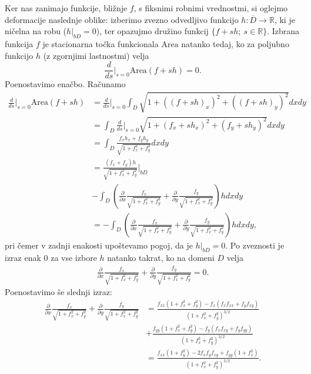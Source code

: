 \documentclass[12pt,a4paper,twoside]{article}
\theoremstyle{definition} %
\theoremstyle{plain} %
\numberwithin{equation}{section}  %
\newcommand{\R}{\mathbb R}
\begin{document}
Ker nas zanimajo funkcije, bližnje $f$, s fiksnimi robnimi vrednostmi, si oglejmo deformacije naslednje oblike:
izberimo zvezno odvedljivo funkcijo $h \colon \overline{D} \to \R$, ki je ničelna na robu ($h|_{bD} = 0$), ter opazujmo družino funkcij $\{f + sh; \ s \in \R \}$.
Izbrana funkcija $f$ je stacionarna točka funkcionala $\text{Area}$ natanko tedaj, ko za poljubno funkcijo $h$ (z zgornjimi lastnostmi) velja
\begin{equation} \label{eq:stac-area(f+sh)}
\frac{d}{ds} \Big|_{s=0} \text{Area}(f+sh) = 0.
\end{equation}
Poenostavimo enačbo. Računamo
\begin{align*}
\frac{d}{ds} \Big|_{s=0} \text{Area}(f+sh) &= \frac{d}{ds} \Big|_{s=0} \int_{D} \sqrt{1 + ((f+sh)_{x})^2 + ((f+sh)_{y})^2} dxdy \\
	&= \int_{D} \frac{d}{ds} \Big|_{s=0} \sqrt{1 + (f_{x}+sh_{x})^2 + (f_{y}+sh_{y})^2} dxdy \\
	&= \int_{D} \frac{f_{x}h_{x} + f_{y}h_{y}}{\sqrt{1 + f_{x}^2 + f_{y}^2}} dxdy \\
	&= \frac{(f_{x} + f_{y})h}{\sqrt{1 + f_{x}^2 + f_{y}^2}} \Big|_{bD} \\
	&- \int_{D} \left( \frac{\partial}{\partial x} \frac{f_{x}}{\sqrt{1 + f_{x}^2 + f_{y}^2}} + \frac{\partial}{\partial y} \frac{f_{y}}{\sqrt{1 + f_{x}^2 + f_{y}^2}} \right) h dxdy \\
	&= - \int_{D} \left( \frac{\partial}{\partial x} \frac{f_{x}}{\sqrt{1 + f_{x}^2 + f_{y}^2}} + \frac{\partial}{\partial y} \frac{f_{y}}{\sqrt{1 + f_{x}^2 + f_{y}^2}} \right) h dxdy,
\end{align*}
pri čemer v zadnji enakosti upoštevamo pogoj, da je $h|_{bD}=0$.
Po zveznosti je izraz enak $0$ za vse izbore $h$ natanko takrat, ko na domeni $D$ velja
\begin{gather}
\frac{\partial}{\partial x} \frac{f_{x}}{\sqrt{1 + f_{x}^2 + f_{y}^2}} + \frac{\partial}{\partial y} \frac{f_{y}}{\sqrt{1 + f_{x}^2 + f_{y}^2}} = 0.
\end{gather}
Poenostavimo še slednji izraz:
\begin{align*}
\frac{\partial}{\partial x} \frac{f_{x}}{\sqrt{1 + f_{x}^2 + f_{y}^2}} + \frac{\partial}{\partial y} \frac{f_{y}}{\sqrt{1 + f_{x}^2 + f_{y}^2}}
	&= \frac{f_{xx}(1 + f_{x}^2 + f_{y}^2) - f_{x}(f_{x}f_{xx} + f_{y}f_{xy})}{(1 + f_{x}^2 + f_{y}^2)^{3/2}} \\
	&+ \frac{f_{yy}(1 + f_{x}^2 + f_{y}^2) - f_{y}(f_{x}f_{xy} + f_{y}f_{yy})}{(1 + f_{x}^2 + f_{y}^2)^{3/2}} \\
	&= \frac{f_{xx}(1+f_{y}^2) - 2f_{x}f_{y}f_{xy} + f_{yy}(1+f_{x}^2)}{(1 + f_{x}^2 + f_{y}^2)^{3/2}}.
\end{align*}
\end{document}
